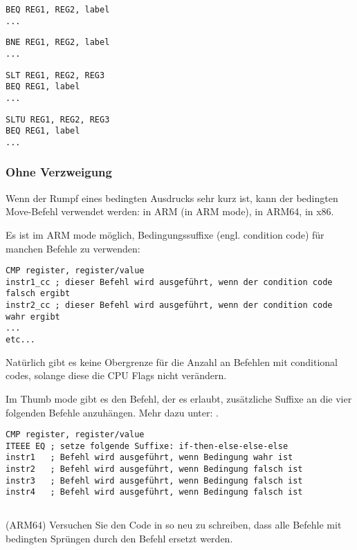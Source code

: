 \begin{lstlisting}[caption=Prüfe auf Gleichheit,style=customasmMIPS]
BEQ REG1, REG2, label
...
\end{lstlisting}

\begin{lstlisting}[caption=Prüfe auf Ungleichheit,style=customasmMIPS]
BNE REG1, REG2, label
...
\end{lstlisting}
\begin{lstlisting}[caption=Prüfe auf größer{,} größer als
(vorzeichenbehaftet),style=customasmMIPS] SLT REG1, REG2, REG3
BEQ REG1, label
...
\end{lstlisting}
\begin{lstlisting}[caption=Prüfe auf kleiner{,} kleiner als
(vorzeichenlos),style=customasmMIPS] SLTU REG1, REG2, REG3
BEQ REG1, label
...
\end{lstlisting}

\subsubsection{Ohne Verzweigung}

Wenn der Rumpf eines bedingten Ausdrucks sehr kurz ist, kann der bedingten
Move-Befehl verwendet werden:
 in ARM (in ARM mode),  in ARM64,  in x86.

Es ist im ARM mode möglich, Bedingungssuffixe (engl. condition code) für manchen
Befehle zu verwenden:

\begin{lstlisting}[caption=ARM (\ARMMode),style=customasmARM]
CMP register, register/value
instr1_cc ; dieser Befehl wird ausgeführt, wenn der condition code falsch ergibt
instr2_cc ; dieser Befehl wird ausgeführt, wenn der condition code wahr ergibt
...
etc...
\end{lstlisting}
Natürlich gibt es keine Obergrenze für die Anzahl an Befehlen mit conditional
codes, solange diese die CPU Flags nicht verändern.


Im Thumb mode gibt es den  Befehl, der es erlaubt, zusätzliche Suffixe
an die vier folgenden Befehle anzuhängen. Mehr dazu unter: .


\begin{lstlisting}[caption=ARM (\ThumbMode),style=customasmARM]
CMP register, register/value
ITEEE EQ ; setze folgende Suffixe: if-then-else-else-else
instr1   ; Befehl wird ausgeführt, wenn Bedingung wahr ist
instr2   ; Befehl wird ausgeführt, wenn Bedingung falsch ist
instr3   ; Befehl wird ausgeführt, wenn Bedingung falsch ist
instr4   ; Befehl wird ausgeführt, wenn Bedingung falsch ist
\end{lstlisting}

\subsection{\Exercise}
(ARM64) Versuchen Sie den Code in  so neu zu schreiben, dass
alle Befehle mit bedingten Sprüngen durch den  Befehl ersetzt werden.


